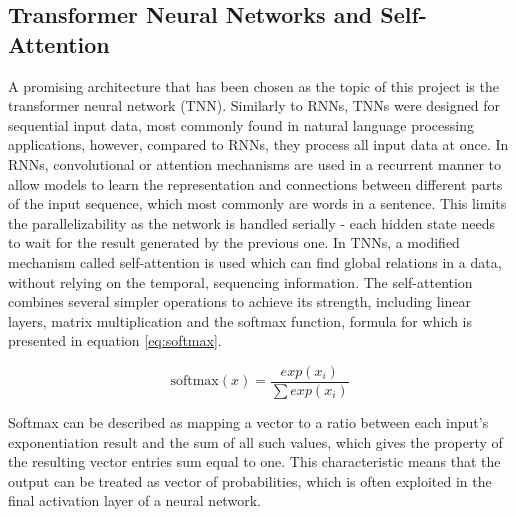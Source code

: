 \subsection{Transformer Neural Networks and Self-Attention}
A promising architecture that has been chosen as the topic of this project is the transformer neural network (TNN). Similarly to RNNs, TNNs were designed for sequential input data, most commonly found in natural language processing applications, however, compared to RNNs, they process all input data at once. In RNNs, convolutional \cite{72-keren2016convolutional} or attention mechanisms \cite{71-chorowski2015attention-based} are used in a recurrent manner to allow models to learn the representation and connections between different parts of the input sequence, which most commonly are words in a sentence. This limits the parallelizability as the network is handled serially - each hidden state needs to wait for the result generated by the previous one. In TNNs, a modified mechanism called self-attention \cite{44-vaswani2017attention} is used which can find global relations in a data, without relying on the temporal, sequencing information. The self-attention combines several simpler operations to achieve its strength, including linear layers, matrix multiplication and the softmax function, formula for which is presented in equation \ref{eq:softmax}.

\begin{equation}\label{eq:softmax}
  \text{softmax}(x) = \frac{exp(x_i)}{\sum exp(x_i)}
\end{equation}

Softmax can be described as mapping a vector to a ratio between each input's exponentiation result and the sum of all such values, which gives the property of the resulting vector entries sum equal to one. This characteristic means that the output can be treated as vector of probabilities, which is often exploited in the final activation layer of a neural network.

